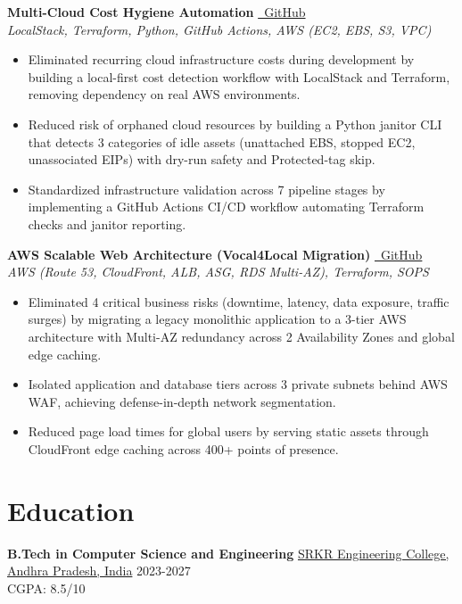 \documentclass[10pt, letterpaper]{article}
\begin{document}
\vspace{6pt}
\noindent \textbf{Multi-Cloud Cost Hygiene Automation} \href{https://github.com/SoulByte07/Multi-Cloud-Cost-Hygiene-Automation}{\faGithub\ GitHub} \\
\textit{LocalStack, Terraform, Python, GitHub Actions, AWS (EC2, EBS, S3, VPC)}
\begin{itemize}
    \item Eliminated recurring cloud infrastructure costs during development by building a local-first cost detection workflow with LocalStack and Terraform, removing dependency on real AWS environments.
    \item Reduced risk of orphaned cloud resources by building a Python janitor CLI that detects 3 categories of idle assets (unattached EBS, stopped EC2, unassociated EIPs) with dry-run safety and Protected-tag skip.
    \item Standardized infrastructure validation across 7 pipeline stages by implementing a GitHub Actions CI/CD workflow automating Terraform checks and janitor reporting.
\end{itemize}

\vspace{6pt}




\noindent \textbf{AWS Scalable Web Architecture (Vocal4Local Migration)} \href{https://github.com/SoulByte07/AWS-Scalable-Web-Architecture}{\faGithub\ GitHub} \\
\textit{AWS (Route 53, CloudFront, ALB, ASG, RDS Multi-AZ), Terraform, SOPS}
\begin{itemize}
    \item Eliminated 4 critical business risks (downtime, latency, data exposure, traffic surges) by migrating a legacy monolithic application to a 3-tier AWS architecture with Multi-AZ redundancy across 2 Availability Zones and global edge caching.
    \item Isolated application and database tiers across 3 private subnets behind AWS WAF, achieving defense-in-depth network segmentation.
    \item Reduced page load times for global users by serving static assets through CloudFront edge caching across 400+ points of presence.
\end{itemize}



\section{Education}
\noindent \textbf{B.Tech in Computer Science and Engineering} \href{https://srkrec.edu.in/}{SRKR Engineering College, Andhra Pradesh, India} \hfill 2023-2027 \\
CGPA: 8.5/10
\end{document}

